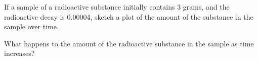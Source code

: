\begin{problem}
\begin{subproblem}
  \item If a sample of a radioactive substance initially contains 3
    grams, and the radioactive decay is 0.00004, sketch a plot of the
    amount of the substance in the sample over time.

    \vfill

  \item What happens to the amount of the radioactive substance in the
    sample as time increases?
    
    \vspace{3em}

  \end{subproblem}

\clearpage


\end{problem}

\postClass

